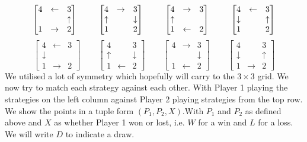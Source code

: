 \documentclass[11pt]{article}
\newcommand{\keywordfont}{\textsc}
\newcommand{\keyword}[1]{%
  \marginpar{\raggedright\small\keywordfont{#1}}}
\begin{document}
\[
\begin{bmatrix}
4 & \leftarrow & 3\\
 & & \uparrow \\
1 & \rightarrow & 2
\end{bmatrix}\hspace{25pt}
\begin{bmatrix}
4 & \rightarrow & 3\\
\uparrow & & \downarrow \\
1 & & 2
\end{bmatrix}\hspace{25pt}
\begin{bmatrix}
4 & \rightarrow & 3\\
 \uparrow & &\\
1 & \leftarrow & 2
\end{bmatrix}\hspace{25pt}
\begin{bmatrix}
4 & \leftarrow & 3\\
\downarrow & &\uparrow \\
1 & & 2
\end{bmatrix}\vspace{5pt}
\]
\[
\begin{bmatrix}
4 & \leftarrow & 3\\
\downarrow & & \\
1 & \rightarrow & 2
\end{bmatrix}\hspace{25pt}
\begin{bmatrix}
4 &  & 3\\
\uparrow & & \downarrow \\
1 & \leftarrow & 2
\end{bmatrix}\hspace{25pt}
\begin{bmatrix}
4 & \rightarrow & 3\\
 & & \downarrow \\
1 & \leftarrow & 2
\end{bmatrix}\hspace{25pt}
\begin{bmatrix}
4 &  & 3\\
\downarrow & & \uparrow \\
1 & \rightarrow & 2
\end{bmatrix}
\]
We utilised a lot of symmetry \keyword{AHA} which hopefully will carry to the $3 \times 3$ grid. We now try \keyword{Try} to match each strategy against each other. With Player 1 playing the strategies on the left column against Player 2 playing strategies from the top row. We show the points in a tuple form $(P_1, P_2, X)$.With $P_1$ and $P_2$ as defined above and $X$ as whether Player 1 won or lost, i.e. $W$ for a win and $L$ for a loss. We will write $D$ to indicate a draw.
\end{document}
